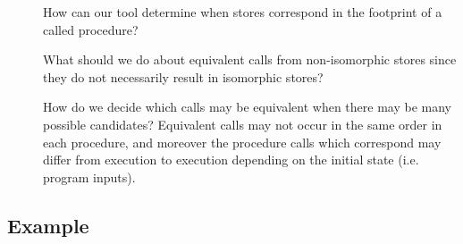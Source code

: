 \documentclass[runningheads,a4paper]{llncs}
\makeatletter
\newcommand*{\ie}{i.e.\@\xspace}
\makeatother
\begin{document}
\begin{description}
\item[\Ctwo{}]How can our tool determine when stores correspond in the footprint of a called procedure?

\item[\Cthree{}]What should we do about equivalent calls from non-isomorphic stores since they do not necessarily result in isomorphic stores?

\item[\Cfour{}]How do we decide which calls may be equivalent when there may be many possible candidates? Equivalent calls may not occur in the same order in each procedure, and moreover the procedure calls which correspond may differ from execution to execution depending on the initial state (\ie program inputs).
\end{description}
%
%
%
%
%

\subsection{Example}\label{sec:example}
\newcommand*{\copylr}{\texttt{lcopy}}
\newcommand*{\copyrl}{\texttt{rcopy}}
\newcommand*{\lang}{\ensuremath{\mathcal{L}}}
\end{document}
